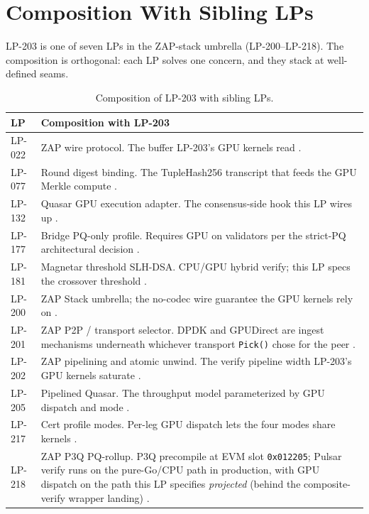 \section{Composition With Sibling LPs}
\label{sec:composition}

LP-203 is one of seven LPs in the ZAP-stack umbrella
(LP-200--LP-218). The composition is orthogonal: each LP solves
one concern, and they stack at well-defined seams.

\begin{table}[h]
\centering
\small
\begin{tabular}{@{}lp{9.5cm}@{}}
\toprule
\textbf{LP} & \textbf{Composition with LP-203} \\
\midrule
LP-022 & ZAP wire protocol. The buffer LP-203's GPU kernels
  read \cite{lp022}. \\
LP-077 & Round digest binding. The TupleHash256 transcript
  that feeds the GPU Merkle compute \cite{lp077}. \\
LP-132 & Quasar GPU execution adapter. The consensus-side hook
  this LP wires up \cite{lp132}. \\
LP-177 & Bridge PQ-only profile. Requires GPU on validators
  per the strict-PQ architectural decision \cite{lp177}. \\
LP-181 & Magnetar threshold SLH-DSA. CPU/GPU hybrid verify;
  this LP specs the crossover threshold \cite{lp181}. \\
LP-200 & ZAP Stack umbrella; the no-codec wire guarantee the
  GPU kernels rely on \cite{lp200}. \\
LP-201 & ZAP P2P / transport selector. DPDK and GPUDirect are
  ingest mechanisms underneath whichever transport
  \texttt{Pick()} chose for the peer \cite{lp201}. \\
LP-202 & ZAP pipelining and atomic unwind. The verify pipeline
  width LP-203's GPU kernels saturate \cite{lp202}. \\
LP-205 & Pipelined Quasar. The throughput model parameterized
  by GPU dispatch and mode \cite{lp205}. \\
LP-217 & Cert profile modes. Per-leg GPU dispatch lets the
  four modes share kernels \cite{lp217}. \\
LP-218 & ZAP P3Q PQ-rollup. P3Q precompile at EVM slot
  \texttt{0x012205}; Pulsar verify runs on the pure-Go/CPU path in
  production, with GPU dispatch on the path this LP specifies
  \emph{projected} (behind the composite-verify wrapper landing)
  \cite{lp218}. \\
\bottomrule
\end{tabular}
\caption{Composition of LP-203 with sibling LPs.}
\label{tab:composition}
\end{table}

